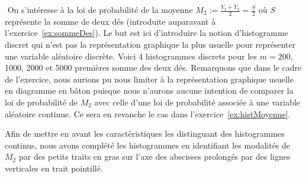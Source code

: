 \documentclass[10pt]{report}
\begin{document}
\begin{exercice} ${ }$\label{ex:histMoyDes}
On s'intéresse à la loi de probabilité de la moyenne $M_2:=\frac{Y_1+Y_2}2=\frac{S}2$ où $S$ représente la somme de deux dés (introduite auparavant à l'exercice~\ref{ex:sommeDes}). Le but est ici d'introduire la notion d'histogramme discret qui n'est pas la représentation graphique la plus usuelle pour représenter une variable aléatoire discrète. Voici 4 histogrammes discrets pour les $m=200$, 1000, 2000 et 5000 premières somme des deux dés. Remarquons que dans le cadre de l'exercice, nous aurions pu nous limiter à la représentation graphique usuelle en diagramme en bâton
puisque nous n'aurons aucune intention de comparer la loi de probabilité de $M_2$ avec celle d'une loi de probabilité associée à une variable aléatoire continue. Ce sera en revanche le cas dans l'exercice~\ref{ex:histMoyenne}.
    








Afin de mettre en avant les caractéristiques les distinguant des histogrammes continus, nous avons complété les histogrammes en identifiant les modalités de $M_2$ par des petits traits en gras sur l'axe des abscisses prolongés par des lignes verticales en trait pointillé.


\end{exercice}
\end{document}

